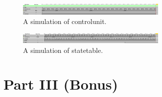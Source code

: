 \documentclass{article}
\begin{document}
\begin{figure}[ht!]
    \centering
    \includegraphics[width=0.65\textwidth]{part2_control_timing.png}
    \caption{A simulation of controlunit.}
    \label{f:part1_simulation}
\end{figure}

\begin{figure}[ht!]
    \centering
    \includegraphics[width=0.65\textwidth]{part2_state_table_timing.png}
    \caption{A simulation of statetable.}
    \label{f:part1_simulation}
\end{figure}



\section{Part III (Bonus)}
\end{document}

